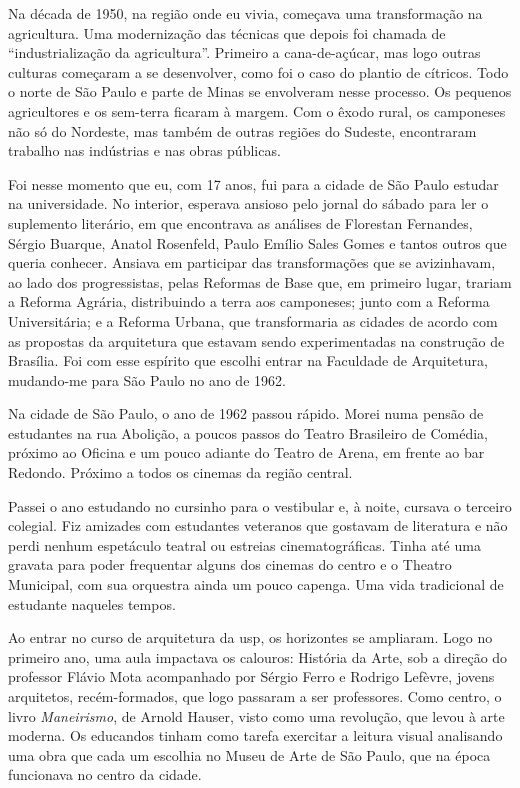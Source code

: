 {Na década de 1950, na região onde eu vivia, começava uma transformação na
agricultura. Uma modernização das técnicas que depois foi chamada de
“industrialização da agricultura”. Primeiro a cana-de-açúcar, mas logo
outras culturas começaram a se desenvolver, como foi o caso do plantio de
cítricos. Todo o norte de São Paulo e parte de Minas se envolveram nesse
processo. Os pequenos agricultores e os sem-terra ficaram à margem. Com o
êxodo rural, os camponeses não só do Nordeste, mas também de outras
regiões do Sudeste, encontraram trabalho nas indústrias e nas obras
públicas.

Foi nesse momento que eu, com 17 anos, fui para a cidade de São Paulo
estudar na universidade. No interior, esperava ansioso pelo jornal
do sábado para ler o suplemento literário, em que encontrava as análises de
Florestan Fernandes, Sérgio Buarque, Anatol Rosenfeld, Paulo Emílio
Sales Gomes e tantos outros que queria conhecer. Ansiava em participar das
transformações que se avizinhavam, ao lado dos progressistas, pelas
Reformas de Base que, em primeiro lugar, trariam a Reforma Agrária,
distribuindo a terra aos camponeses; junto com a Reforma Universitária; e
a Reforma Urbana, que transformaria as cidades de acordo com as propostas
da arquitetura que estavam sendo experimentadas na construção de
Brasília. Foi com esse espírito que escolhi entrar na Faculdade de
Arquitetura, mudando-me para São Paulo no ano de 1962.

\subject{São Paulo e a {\cap fau}}

Na cidade de São Paulo, o ano de 1962 passou rápido. Morei numa pensão de
estudantes na rua Abolição, a poucos passos do Teatro Brasileiro de
Comédia, próximo ao Oficina e um pouco adiante do Teatro de Arena, em
frente ao bar Redondo. Próximo a todos os cinemas da região central.

Passei o ano estudando no cursinho para o vestibular e, à noite, cursava
o terceiro colegial. Fiz amizades com estudantes veteranos que gostavam
de literatura e não perdi nenhum espetáculo teatral ou estreias
cinematográficas. Tinha até uma gravata para poder frequentar alguns dos
cinemas do centro e o Theatro Municipal, com sua orquestra ainda um pouco
capenga. Uma vida tradicional de estudante naqueles tempos.

Ao entrar no curso de arquitetura da {\sc usp}, os horizontes se ampliaram.
Logo no primeiro ano, uma aula impactava os calouros: História
da Arte, sob a direção do professor Flávio Mota acompanhado por Sérgio
Ferro e Rodrigo Lefèvre, jovens arquitetos, recém-formados, que logo
passaram a ser professores. Como centro, o livro {\it Maneirismo}, de Arnold
Hauser, visto como uma revolução, que levou à arte moderna.
Os educandos tinham como tarefa exercitar a leitura visual analisando
uma obra que cada um escolhia no Museu de Arte de São Paulo, que na época
funcionava no centro da cidade.

}

